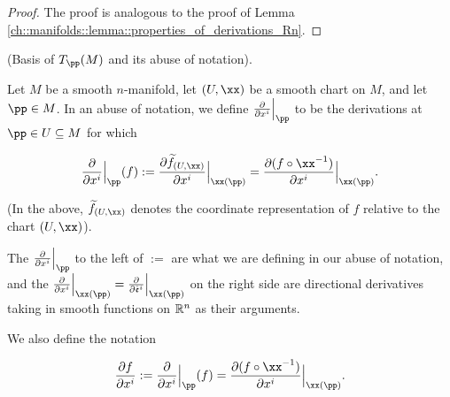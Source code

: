 \begin{proof}
    The proof is analogous to the proof of Lemma \ref{ch::manifolds::lemma::properties_of_derivations_Rn}.
\end{proof}
    
\begin{defn}
\label{ch::manifolds::defn::basis_of_TpM}
     (Basis of $T_\pp(M)$ and its abuse of notation).
    
    Let $M$ be a smooth $n$-manifold, let $(U, \xx)$ be a smooth chart on $M$, and let $\pp \in M$. In an abuse of notation, we define $\frac{\pd}{\pd x^i}\Big|_\pp$ to be the derivations at $\pp \in U \subseteq M$ for which
    
    \begin{align*}
        \frac{\pd}{\pd x^i}\Big|_\pp(f) := \frac{\pd \tf_{(U, \xx)}}{\pd x^i}\Big|_{\xx(\pp)} = \frac{\pd (f \circ \xx^{-1})}{\pd x^i}\Big|_{\xx(\pp)}.
    \end{align*}
    
    (In the above, $\tf_{(U, \xx)}$ denotes the coordinate representation of $f$ relative to the chart $(U, \xx)$).
    
    The $\frac{\pd}{\pd x^i}\Big|_\pp$ to the left of $:=$ are what we are defining in our abuse of notation, and the $\frac{\pd}{\pd x^i}\Big|_{\xx(\pp)} = \frac{\pd}{\pd \see^i}\Big|_{\xx(\pp)}$ on the right side are directional derivatives taking in smooth functions on $\mathbb{R}^n$ as their arguments. 

    We also define the notation

    \begin{align*}
        \frac{\pd f}{\pd x^i} := \frac{\pd}{\pd x^i}\Big|_\pp(f) = \frac{\pd (f \circ \xx^{-1})}{\pd x^i}\Big|_{\xx(\pp)}.
    \end{align*}
\end{defn}

